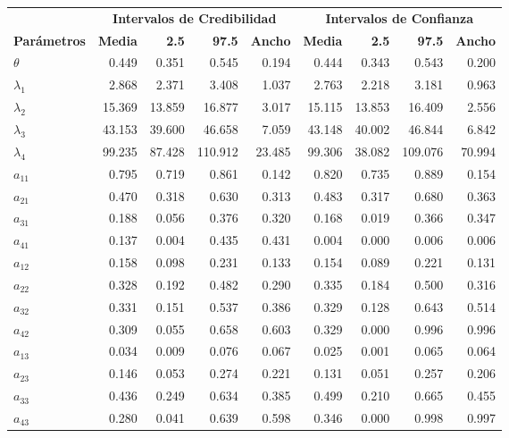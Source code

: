 \documentclass[a4paper]{article}\usepackage[]{graphicx}\usepackage[]{color}
\begin{document}
\begin{table}[ht]
\centering
\begin{tabular}{lrrrrrrrr}
  \toprule
   & \multicolumn{4}{c}{\textbf{Intervalos de Credibilidad}} & \multicolumn{4}{c}{\textbf{Intervalos de Confianza}}\\
 \cmidrule(lr){2-5}\cmidrule(lr){6-9}
 \textbf{Parámetros} & \textbf{Media} & \textbf{2.5} & \textbf{97.5} & \textbf{Ancho} & \textbf{Media} & \textbf{2.5} & \textbf{97.5} & \textbf{Ancho}\\
 \midrule
$\theta$ & 0.449 & 0.351 & 0.545 & 0.194 & 0.444 & 0.343 & 0.543 & 0.200 \\ 
  $\lambda_1$ & 2.868 & 2.371 & 3.408 & 1.037 & 2.763 & 2.218 & 3.181 & 0.963 \\ 
  $\lambda_2$ & 15.369 & 13.859 & 16.877 & 3.017 & 15.115 & 13.853 & 16.409 & 2.556 \\ 
  $\lambda_3$ & 43.153 & 39.600 & 46.658 & 7.059 & 43.148 & 40.002 & 46.844 & 6.842 \\ 
  $\lambda_4$ & 99.235 & 87.428 & 110.912 & 23.485 & 99.306 & 38.082 & 109.076 & 70.994 \\ 
  $a_{11}$ & 0.795 & 0.719 & 0.861 & 0.142 & 0.820 & 0.735 & 0.889 & 0.154 \\ 
  $a_{21}$ & 0.470 & 0.318 & 0.630 & 0.313 & 0.483 & 0.317 & 0.680 & 0.363 \\ 
  $a_{31}$ & 0.188 & 0.056 & 0.376 & 0.320 & 0.168 & 0.019 & 0.366 & 0.347 \\ 
  $a_{41}$ & 0.137 & 0.004 & 0.435 & 0.431 & 0.004 & 0.000 & 0.006 & 0.006 \\ 
  $a_{12}$ & 0.158 & 0.098 & 0.231 & 0.133 & 0.154 & 0.089 & 0.221 & 0.131 \\ 
  $a_{22}$ & 0.328 & 0.192 & 0.482 & 0.290 & 0.335 & 0.184 & 0.500 & 0.316 \\ 
  $a_{32}$ & 0.331 & 0.151 & 0.537 & 0.386 & 0.329 & 0.128 & 0.643 & 0.514 \\ 
  $a_{42}$ & 0.309 & 0.055 & 0.658 & 0.603 & 0.329 & 0.000 & 0.996 & 0.996 \\ 
  $a_{13}$ & 0.034 & 0.009 & 0.076 & 0.067 & 0.025 & 0.001 & 0.065 & 0.064 \\ 
  $a_{23}$ & 0.146 & 0.053 & 0.274 & 0.221 & 0.131 & 0.051 & 0.257 & 0.206 \\ 
  $a_{33}$ & 0.436 & 0.249 & 0.634 & 0.385 & 0.499 & 0.210 & 0.665 & 0.455 \\ 
  $a_{43}$ & 0.280 & 0.041 & 0.639 & 0.598 & 0.346 & 0.000 & 0.998 & 0.997 \\ 

\end{tabular}
\end{table}
\end{document}
